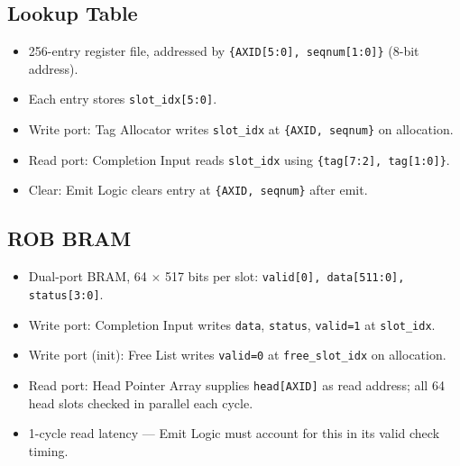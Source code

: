 \subsection{Lookup Table}
\begin{itemize}[noitemsep]
  \item 256-entry register file, addressed by \texttt{\{AXID[5:0], seqnum[1:0]\}} (8-bit address).
  \item Each entry stores \texttt{slot\_idx[5:0]}.
  \item Write port: Tag Allocator writes \texttt{slot\_idx} at \texttt{\{AXID, seqnum\}} on allocation.
  \item Read port: Completion Input reads \texttt{slot\_idx} using \texttt{\{tag[7:2], tag[1:0]\}}.
  \item Clear: Emit Logic clears entry at \texttt{\{AXID, seqnum\}} after emit.
\end{itemize}

\subsection{ROB BRAM}
\begin{itemize}[noitemsep]
  \item Dual-port BRAM, 64 $\times$ 517 bits per slot: \texttt{valid[0], data[511:0], status[3:0]}.
  \item Write port: Completion Input writes \texttt{data}, \texttt{status}, \texttt{valid=1} at \texttt{slot\_idx}.
  \item Write port (init): Free List writes \texttt{valid=0} at \texttt{free\_slot\_idx} on allocation.
  \item Read port: Head Pointer Array supplies \texttt{head[AXID]} as read address; all 64 head slots checked in parallel each cycle.
  \item 1-cycle read latency — Emit Logic must account for this in its valid check timing.
\end{itemize}

